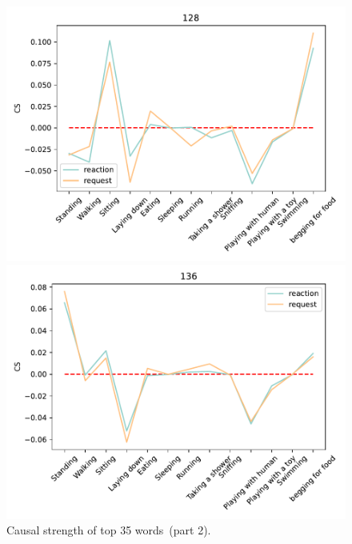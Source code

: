 \begin{figure}[ht]
		\begin{minipage}[b]{.3\linewidth}
			\centering
			\includegraphics[width=0.99\linewidth]{./35word/128.pdf}
		\end{minipage}
		\begin{minipage}[b]{.3\linewidth}
			\centering
			\includegraphics[width=0.99\linewidth]{./35word/136.pdf}
		\end{minipage}

	\caption{Causal strength of top 35 words~(part 2).}
	\label{fig:words35p2}
\end{figure}
